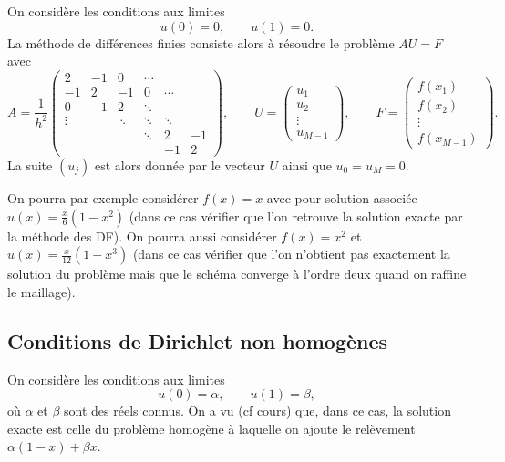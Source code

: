 \documentclass[12pt]{article}
\begin{document}
On consid\`ere les conditions aux limites
\begin{equation}
  \label{eq:Dir_hom}
  u(0) = 0 , \qquad u(1) = 0 .
\end{equation}
La m\'ethode de diff\'erences finies consiste alors \`a r\'esoudre le probl\`eme
$A U = F$ avec
\begin{equation}
  \label{eq:matDir}
  A = \dfrac{1}{h^2} 
  \begin{pmatrix} 
    2 & -1 & 0 & \cdots
    \\
    -1 & 2 & -1 & 0 & \cdots
    \\
    0 & -1 & 2 & \ddots &
    \\
    \vdots & & \ddots & \ddots & \ddots
    \\
    & & &  \ddots & 2 & -1
    \\
    & &  & & -1 & 2
  \end{pmatrix} , \qquad U = 
  \begin{pmatrix}
    u_1 \\ u_2 \\ \vdots \\ u_{M-1}
  \end{pmatrix} , \qquad F = 
  \begin{pmatrix}
    f(x_1) \\ f(x_2) \\ \vdots \\ f(x_{M-1})
  \end{pmatrix} .
\end{equation}
La suite $(u_j)$ est alors donn\'ee par le vecteur $U$ ainsi que $u_0 = u_M = 0$.


On pourra par exemple consid\'erer $f(x)=x$ avec pour solution associ\'ee
$u(x) = \frac{x}{6}(1-x^2)$ (dans ce cas v\'erifier que l'on retrouve la solution exacte
par la m\'ethode des DF).
On pourra aussi consid\'erer $f(x) = x^2$ et $u(x) = \frac{x}{12}(1-x^3)$
(dans ce cas v\'erifier que l'on n'obtient pas exactement la solution du probl\`eme
mais que le sch\'ema converge \`a l'ordre deux quand on raffine le maillage).

\subsection{Conditions de Dirichlet non homog\`enes}
On consid\`ere les conditions aux limites
\begin{equation}
  \label{eq:Dir_non_hom}
  u(0) = \alpha , \qquad u(1) = \beta ,
\end{equation}
o\`u $\alpha$ et $\beta$ sont des r\'eels connus.
On a vu (cf cours) que, dans ce cas, la solution exacte est celle du probl\`eme homog\`ene
\`a laquelle on ajoute le rel\`evement $\alpha (1-x) + \beta x$.
\end{document}
